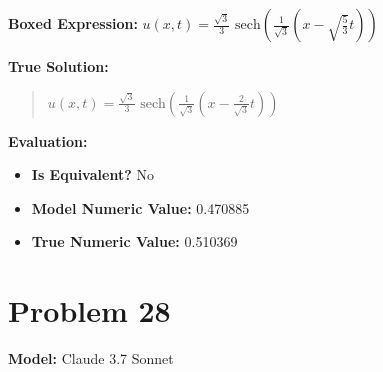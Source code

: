 \documentclass{article}
\begin{document}
\textbf{Boxed Expression:} $u(x,t) = \frac{\sqrt{3}}{3}\text{ sech}\left(\frac{1}{\sqrt{3}}(x-\sqrt{\frac{5}{3}}t)\right)$

\textbf{True Solution:}
\begin{quote}
$u(x,t) = \frac{\sqrt{3}}{3} \text{ sech}(\frac{1}{\sqrt{3}} (x - \frac{2}{\sqrt{3}}t))$
\end{quote}

\textbf{Evaluation:}
\begin{itemize}
\item \textbf{Is Equivalent?} No
\item \textbf{Model Numeric Value:} 0.470885
\item \textbf{True Numeric Value:} 0.510369
\end{itemize}
\vspace{1cm}
\section*{Problem 28}
\textbf{Model:} Claude 3.7 Sonnet
\end{document}
